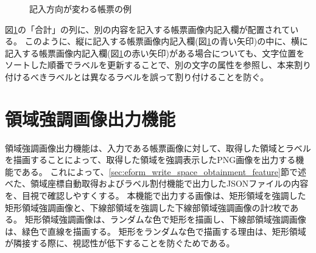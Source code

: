 \begin{figure}[tp]
    \begin{center}
        \caption{記入方向が変わる帳票の例}
        \label{fig:label_order}
    \end{center}
\end{figure}

図\ref{fig:label_order}の「合計」の列に、別の内容を記入する帳票画像内記入欄が配置されている。
このように、縦に記入する帳票画像内記入欄(図\ref{fig:label_order}の青い矢印)の中に、横に記入する帳票画像内記入欄(図\ref{fig:label_order}の赤い矢印)がある場合についても、文字位置をソートした順番でラベルを更新することで、別の文字の属性を参照し、本来割り付けるべきラベルとは異なるラベルを誤って割り付けることを防ぐ。

\section{領域強調画像出力機能}\label{sec:highlighted_area_image_output}
領域強調画像出力機能は、入力である帳票画像に対して、取得した領域とラベルを描画することによって、取得した領域を強調表示したPNG画像を出力する機能である。
これによって、\ref{sec:eform_write_space_obtainment_feature}節で述べた、領域座標自動取得およびラベル割付機能で出力したJSONファイルの内容を、目視で確認しやすくする。
本機能で出力する画像は、矩形領域を強調した矩形領域強調画像と、下線部領域を強調した下線部領域強調画像の計2枚である。
矩形領域強調画像は、ランダムな色で矩形を描画し、下線部領域強調画像は、緑色で直線を描画する。
矩形をランダムな色で描画する理由は、矩形領域が隣接する際に、視認性が低下することを防ぐためである。

